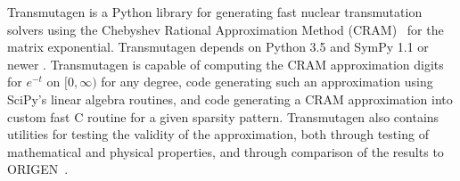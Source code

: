 
Transmutagen is a Python library for generating fast nuclear transmutation
solvers using the Chebyshev Rational Approximation Method
(CRAM)~\cite{ationneeded} for the matrix exponential. Transmutagen depends on
Python 3.5 and SymPy 1.1 or newer . Transmutagen is
capable of computing the CRAM approximation digits for $e^{-t}$ on
$[0, \infty)$ for any degree, code generating such an approximation using
SciPy's linear algebra routines, and code generating a CRAM approximation into
custom fast C routine for a given sparsity pattern. Transmutagen also contains
utilities for testing the validity of the approximation, both through testing
of mathematical and physical properties, and through comparison of the results
to ORIGEN~\cite{ationneeded}.

